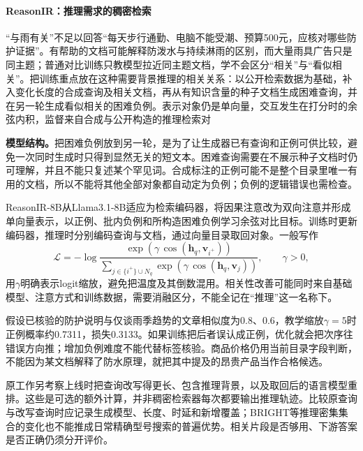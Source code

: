 \Needspace{135mm}
\paragraph{ReasonIR：推理需求的稠密检索}
\label{sec:rs-search-reasonir}

“与雨有关”不足以回答“每天步行通勤、电脑不能受潮、预算500元，应核对哪些防护证据”。有帮助的文档可能解释防泼水与持续淋雨的区别，而大量雨具广告只是同主题；普通对比训练只教模型拉近同主题文档，学不会区分“相关”与“看似相关”。把训练重点放在这种需要背景推理的相关关系：以公开检索数据为基础，补入变化长度的合成查询及相关文档，再从有知识含量的种子文档生成困难查询，并在另一轮生成看似相关的困难负例。表示对象仍是单向量，交互发生在打分时的余弦内积，监督来自合成与公开构造的推理检索对

\textbf{模型结构。}把困难负例放到另一轮，是为了让生成器已有查询和正例可供比较，避免一次同时生成时只得到显然无关的短文本。困难查询需要在不展示种子文档时仍可理解，并且不能只复述某个罕见词。合成标注的正例可能不是整个目录里唯一有用的文档，所以不能将其他全部对象都自动定为负例；负例的逻辑错误也需检查。

ReasonIR-8B从Llama3.1-8B适应为检索编码器，将因果注意改为双向注意并形成单向量表示，以正例、批内负例和所构造困难负例学习余弦对比目标。训练时更新编码器，推理时分别编码查询与文档，通过向量目录取回对象。一般写作
\begin{equation}
 \mathcal L=-\log\frac{\exp(\gamma\,\cos(\bm h_q,\bm v_{i^+}))}
 {\sum_{j\in\{i^+\}\cup N_q}\exp(\gamma\,\cos(\bm h_q,\bm v_j))},
 \qquad \gamma>0 ,
 \label{eq:rs-search-reasonir-objective}
\end{equation}
用$\gamma$明确表示logit缩放，避免把温度及其倒数混用。相关性改善可能同时来自基础模型、注意方式和训练数据，需要消融区分，不能全记在“推理”这一名称下。

假设已核验的防护说明与仅谈雨季趋势的文章相似度为0.8、0.6，教学缩放$\gamma=5$时正例概率约0.7311，损失0.3133。如果训练把后者误认成正例，优化就会把次序往错误方向推；增加负例难度不能代替标签核验。商品价格仍用当前目录字段判断，不能因为某文档解释了防水原理，就把其中提及的昂贵产品当作合格候选。

原工作另考察上线时把查询改写得更长、包含推理背景，以及取回后的语言模型重排。这些是可选的额外计算，并非稠密检索器每次都要输出推理轨迹。比较原查询与改写查询时应记录生成模型、长度、时延和新增覆盖；BRIGHT等推理密集集合的变化也不能推成日常精确型号搜索的普遍优势。相关片段是否够用、下游答案是否正确仍须分开评价。

\Needspace{100mm}
